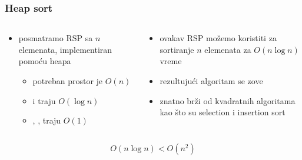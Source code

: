 \documentclass[compress,aspectratio=169]{beamer}
\begin{document}
\begin{frame}[fragile]
  \frametitle{Heap sort}
  \begin{columns}
    \begin{column}[c]{6cm}
      \begin{itemize}
        \item posmatramo RSP sa $n$ elemenata, implementiran pomoću heapa
        \begin{itemize}
          \item potreban prostor je $O(n)$
          \item {} i  traju $O(\log n)$
          \item {}, ,  traju $O(1)$
        \end{itemize}
      \end{itemize}
    \end{column}
    \begin{column}[c]{6cm}
      \begin{itemize}
        \item ovakav RSP možemo koristiti za sortiranje $n$ elemenata za $O(n\log n)$ vreme
        \item rezultujući algoritam se zove 
        \item znatno brži od kvadratnih algoritama kao što su selection i insertion sort
      \end{itemize}
    \end{column}
  \end{columns}
  $$O(n\log n) < O(n^2)$$
\end{frame}
\end{document}
